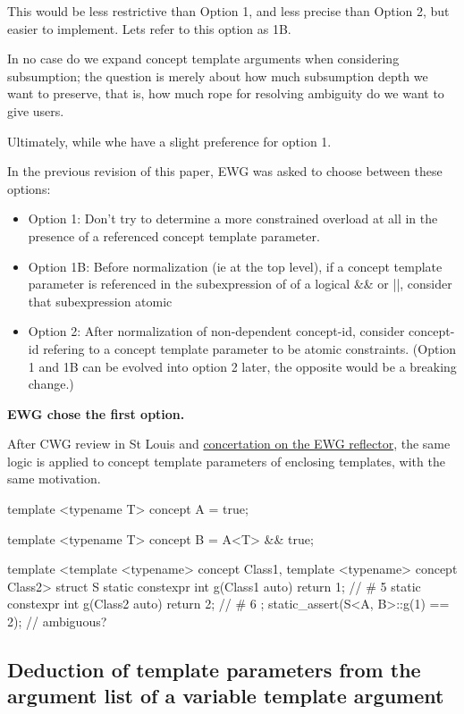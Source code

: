 \documentclass{wg21}
\begin{document}
This would be less restrictive than Option 1, and less precise than Option 2, but easier to implement.
Lets refer to this option as 1B.

In no case do we expand concept template arguments when considering subsumption; the question is merely about how much subsumption depth we want to preserve, that is, how much rope for resolving ambiguity do we want to give users.

Ultimately, while whe have a slight preference for option 1.

In the previous revision of this paper, EWG was asked to choose between these options:

\begin{itemize}
\item Option  1: Don't try to determine a more constrained overload at all in the presence of a referenced concept template parameter.
\item Option 1B: Before normalization (ie at the top level), if a concept template parameter is referenced in the subexpression of of a logical \&\& or ||, consider that subexpression atomic
\item Option 2:  After normalization of non-dependent concept-id, consider concept-id refering to a concept template parameter to be atomic constraints.
(Option 1 and 1B can be evolved into option 2 later, the opposite would be a breaking change.)
\end{itemize}

\textbf{EWG chose the first option.}

After CWG review in St Louis and \href{https://lists.isocpp.org/ext/2024/10/23412.php}{concertation on the EWG reflector}, the same logic is applied to
concept template parameters of enclosing templates, with the same motivation.

\begin{colorblock}
template <typename T>
concept A = true;

template <typename T>
concept B = A<T> && true;

template <template <typename> concept Class1,
          template <typename> concept Class2>
struct S {
     static constexpr int g(Class1 auto) {return 1;} // # 5
     static constexpr int g(Class2 auto) {return 2;} // # 6
};
static_assert(S<A, B>::g(1) == 2); // ambiguous?
\end{colorblock}


\subsection{Deduction of template parameters from the argument list of a variable template argument}
\end{document}
